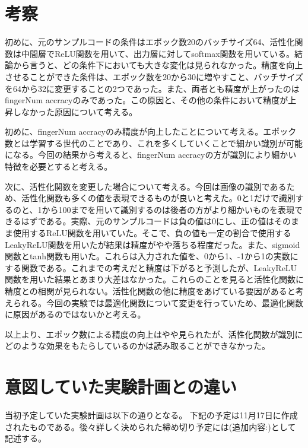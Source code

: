 \documentclass[a4paper, 11pt, titlepage]{jsarticle}
\begin{document}
\section{考察}
初めに、元のサンプルコードの条件はエポック数20のバッチサイズ64、活性化関数は中間層でReLU関数を用いて、出力層に対してsoftmax関数を用いている。結論から言うと、どの条件下においても大きな変化は見られなかった。精度を向上させることができた条件は、エポック数を20から30に増やすこと、バッチサイズを64から32に変更することの2つであった。また、両者とも精度が上がったのは fingerNum accracyのみであった。この原因と、その他の条件において精度が上昇しなかった原因について考える。

初めに、fingerNum accracyのみ精度が向上したことについて考える。エポック数とは学習する世代のことであり、これを多くしていくことで細かい識別が可能になる。今回の結果から考えると、fingerNum accracyの方が識別により細かい特徴を必要とすると考える。

次に、活性化関数を変更した場合について考える。今回は画像の識別であるため、活性化関数も多くの値を表現できるものが良いと考えた。0と1だけで識別するのと、1から100までを用いて識別するのは後者の方がより細かいものを表現できるはずである。実際、元のサンプルコードは負の値は0にし、正の値はそのまま使用するReLU関数を用いていた。そこで、負の値も一定の割合で使用するLeakyReLU関数を用いたが結果は精度がやや落ちる程度だった。また、sigmoid関数とtanh関数も用いた。これらは入力された値を、0から1、-1から1の実数にする関数である。これまでの考えだと精度は下がると予測したが、LeakyReLU関数を用いた結果とあまり大差はなかった。これらのことを見ると活性化関数に精度との相関が見られない。活性化関数の他に精度をあげている要因があると考えられる。今回の実験では最適化関数について変更を行っていため、最適化関数に原因があるのではないかと考える。

以上より、エポック数による精度の向上はやや見られたが、活性化関数が識別にどのような効果をもたらしているのかは読み取ることができなかった。

\newpage%
\section{意図していた実験計画との違い}

当初予定していた実験計画は以下の通りとなる。
下記の予定は11月17日に作成されたものである。後々詳しく決められた締め切り予定には(追加内容:)として記述する。%
\end{document}
